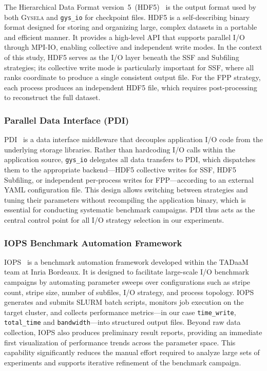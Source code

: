 The Hierarchical Data Format version~5~(HDF5)~\cite{folk2011overview} is the output format used
by both \textsc{Gysela} and \texttt{gys\_io} for checkpoint files. HDF5 is a
self-describing binary format designed for storing and organizing large, complex
datasets in a portable and efficient manner. It provides a high-level API that
supports parallel I/O through MPI-IO, enabling collective and independent write
modes. In the context of this study, HDF5 serves as the I/O layer beneath the SSF
and Subfiling strategies; its collective write mode is particularly important for
SSF, where all ranks coordinate to produce a single consistent output file. For the
FPP strategy, each process produces an independent HDF5 file, which requires
post-processing to reconstruct the full dataset.

\subsubsection{Parallel Data Interface (PDI)}
\label{sec:pdi}

PDI~\cite{roussel2017pdi} is a data interface middleware that decouples application I/O code
from the underlying storage libraries. Rather than hardcoding I/O calls within the
application source, \texttt{gys\_io} delegates all data transfers to PDI, which
dispatches them to the appropriate backend---HDF5 collective writes for SSF,
HDF5 Subfiling, or independent per-process writes for FPP---according to an
external YAML configuration file. This design allows switching between strategies
and tuning their parameters without recompiling the application binary, which is
essential for conducting systematic benchmark campaigns. PDI thus acts as the
central control point for all I/O strategy selection in our experiments.

\subsubsection{IOPS Benchmark Automation Framework}
\label{sec:iops}

IOPS~\cite{iops_tool} is a benchmark automation framework developed within the TADaaM team at Inria
Bordeaux. It is designed to facilitate large-scale I/O benchmark campaigns by
automating parameter sweeps over configurations such as stripe count, stripe size,
number of subfiles, I/O strategy, and process topology. IOPS generates and submits
SLURM batch scripts, monitors job execution on the target cluster, and collects
performance metrics---in our case \texttt{time\_write}, \texttt{total\_time} and
\texttt{bandwidth}---into structured output files. Beyond raw data collection, IOPS also
produces preliminary result reports, providing an immediate first visualization of
performance trends across the parameter space. This capability significantly reduces
the manual effort required to analyze large sets of experiments and supports
iterative refinement of the benchmark campaign.